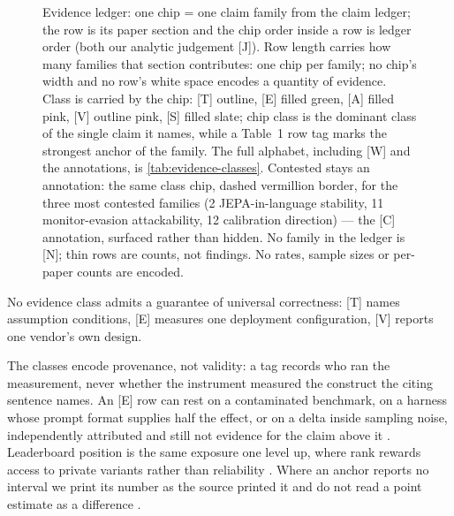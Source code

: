 \begin{figure}[!t]
  \centering
  \resizebox{\linewidth}{!}{}
  \caption{ Evidence ledger: one chip = one claim family from the claim ledger; the row is its paper section and the chip order inside a row is ledger order (both our analytic judgement [J]). Row length carries how many families that section contributes: one chip per family; no chip's width and no row's white space encodes a quantity of evidence. Class is carried by the chip: [T] outline, [E] filled green, [A] filled pink, [V] outline pink, [S] filled slate; chip class is the dominant class of the single claim it names, while a Table~1 row tag marks the strongest anchor of the family. The full alphabet, including [W] and the annotations, is \cref{tab:evidence-classes}. Contested stays an annotation: the same class chip, dashed vermillion border, for the three most contested families (2 JEPA-in-language stability, 11 monitor-evasion attackability, 12 calibration direction) --- the [C] annotation, surfaced rather than hidden. No family in the ledger is [N]; thin rows are counts, not findings. No rates, sample sizes or per-paper counts are encoded.}
  \label{fig:evidence}
\end{figure}

No evidence class admits a guarantee of universal correctness: [T] names assumption
conditions, [E] measures one deployment configuration, [V] reports one vendor's own design.

The classes encode provenance, not validity: a tag records who ran the measurement, never
whether the instrument measured the construct the citing sentence names. An [E] row can rest
on a contaminated benchmark, on a harness whose prompt format supplies half the effect, or on
a delta inside sampling noise, independently attributed and still not evidence for the claim
above it \cite{measwhatmatters2025,quantconstruct2026,contamsurvey2025,contamresist2026}.
Leaderboard position is the same exposure one level up, where rank rewards access to private
variants rather than reliability \cite{leaderillusion2025}. Where an anchor reports no
interval we print its number as the source printed it and do not read a point estimate as a
difference \cite{errorbars2024,evalci2026}.

